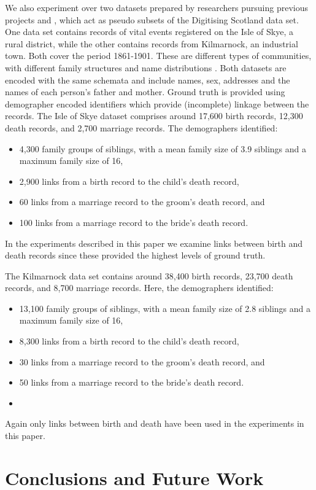 \documentclass{llncs}
\begin{document}
We also experiment over two datasets prepared by researchers pursuing previous projects \cite{reid2002} and \cite{reid2006}, which act as pseudo subsets of the Digitising Scotland data set. One data set contains records of vital events registered on the Isle of Skye, a rural district, while the other contains records from Kilmarnock, an industrial town. Both cover the period 1861-1901. These are different types of communities, with different family structures and name distributions \cite{reid2002}. Both datasets are encoded with the same schemata and include names, sex, addresses and the names of each person's father and mother. Ground truth is provided using demographer encoded identifiers which provide (incomplete) linkage between the records.  The Isle of Skye dataset comprises around 17,600 birth records, 12,300 death records, and 2,700 marriage records.
The demographers  identified:
\begin{itemize}
\item 4,300 family groups of siblings, with a mean family size of 3.9 siblings and a maximum family size of 16,
\item 2,900 links from a birth record to the child's death record,
\item 60 links from a marriage record to the groom's death record, and
\item 100 links from a marriage record to the bride's death record.
\end{itemize}
In the experiments described in this paper we examine links between birth and death records since these provided the highest levels of ground truth.

The Kilmarnock data set contains around 38,400 birth records, 23,700 death records, and 8,700 marriage records. Here, the demographers identified:
\begin{itemize}
\item 13,100 family groups of siblings, with a mean family size of 2.8 siblings and a  maximum family size of 16,
\item 8,300 links from a birth record to the child's death record,
\item 30 links from a marriage record to the groom's death record, and
\item 50 links from a marriage record to the bride's death record.
\item 
\end{itemize}
Again only links between birth and death have been used in the experiments in this paper.



\section{Conclusions and Future Work}
\label{sec-concl}



 
\end{document}
